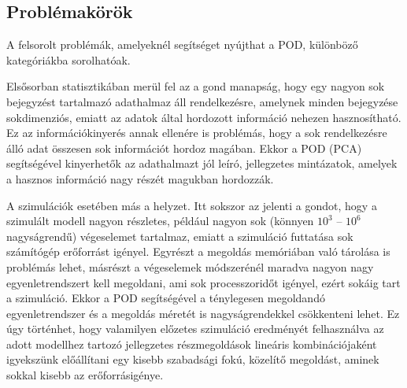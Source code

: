         \subsection{Problémakörök}
            A felsorolt problémák, amelyeknél segítséget nyújthat a POD, különböző kategóriákba sorolhatóak.
            \par
            Elsősorban statisztikában merül fel az a gond manapság, hogy egy nagyon sok bejegyzést tartalmazó adathalmaz áll rendelkezésre, amelynek minden bejegyzése sokdimenziós, emiatt az adatok által hordozott információ nehezen hasznosítható. Ez az információkinyerés annak ellenére is problémás, hogy a sok rendelkezésre álló adat összesen sok információt hordoz magában. Ekkor a POD (PCA) segítségével kinyerhetők az adathalmazt jól leíró, jellegzetes mintázatok, amelyek a hasznos információ nagy részét magukban hordozzák.
            \par
            A szimulációk esetében más a helyzet. Itt sokszor az jelenti a gondot, hogy a szimulált modell nagyon részletes, például nagyon sok (könnyen $10^3$ -- $10^6$ nagyságrendű) végeselemet tartalmaz, emiatt a szimuláció futtatása sok számítógép erőforrást igényel. Egyrészt a megoldás memóriában való tárolása is problémás lehet, másrészt a végeselemek módszerénél maradva nagyon nagy egyenletrendszert kell megoldani, ami sok processzoridőt igényel, ezért sokáig tart a szimuláció. Ekkor a POD segítségével a ténylegesen megoldandó egyenletrendszer és a megoldás méretét is nagyságrendekkel csökkenteni lehet. Ez úgy történhet, hogy valamilyen előzetes szimuláció eredményét felhasználva az adott modellhez tartozó jellegzetes részmegoldások lineáris kombinációjaként igyekszünk előállítani egy kisebb szabadsági fokú, közelítő megoldást, aminek sokkal kisebb az erőforrásigénye.
